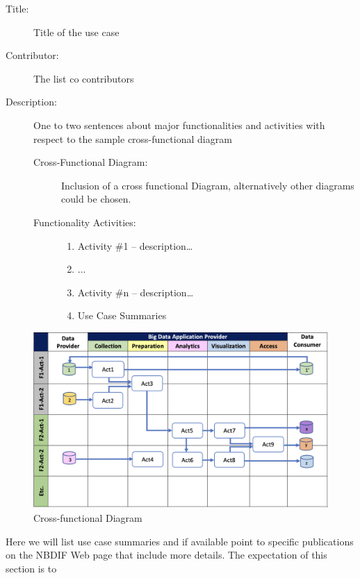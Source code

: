 \documentclass[12pt]{article}
\begin{document}
\begin{description}
\item[Title:] 		Title of the use case
\item[Contributor:] 	The list co contributors
\item[Description:] 	One to two sentences about major functionalities and activities with respect to the sample cross-functional diagram
	
	\begin{description}
	\item[Cross-Functional Diagram:]
		Inclusion of a cross functional Diagram, alternatively other diagrams could be 			chosen.
	\item[Functionality Activities:]
	\begin{enumerate}
        \item Activity \#1 – description…
        \item ...
        \item Activity \#n – description…
    	\item Use Case Summaries
    \end{enumerate}
\end{description}
\end{description}

\begin{figure}[htb]
    \centering
    \includegraphics[width=1.0\textwidth]{images/cross-functional-diagram.png}
    \caption{Cross-functional Diagram}
    \label{fig:cross-functional-diagram}
\end{figure}


Here we will list use case summaries and if available point to specific publications on the NBDIF Web page that include more details. The expectation of this section is to
 
\end{document}
